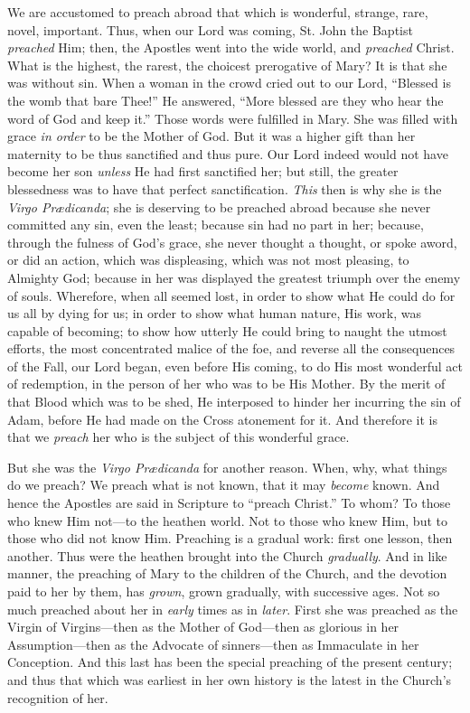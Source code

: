 We are accustomed to preach
abroad that which is wonderful, strange, rare, novel, important. Thus,
when our Lord was coming, St. John the Baptist \emph{preached} Him;
then, the Apostles went into the wide world, and \emph{preached} Christ.
What is the highest, the rarest, the choicest prerogative of Mary? It is
that she was without sin. When a woman in the crowd cried out to our
Lord, ``Blessed is the womb that bare Thee!'' He answered, ``More blessed
are they who hear the word of God and keep it.'' Those words were
fulfilled in Mary. She was filled with grace \emph{in order} to be the
Mother of God. But it was a higher gift than her maternity to be thus
sanctified and thus pure. Our Lord indeed would not have become her
son \emph{unless} He had first sanctified her; but still, the greater
blessedness was to have that perfect sanctification. \emph{This} then is
why she is the \emph{Virgo Prædicanda}; she is deserving to be preached
abroad because she never committed any sin, even the least; because sin
had no part in her; because, through the fulness of God's grace, she
never thought a thought, or spoke a\emph{}word, or did an action, which
was displeasing, which was not most pleasing, to Almighty God; because
in her was displayed the greatest triumph over the enemy of souls.
Wherefore, when all seemed lost, in order to show what He could do for
us all by dying for us; in order to show what human nature, His work,
was capable of becoming; to show how utterly He could bring to naught
the utmost efforts, the most concentrated malice of the foe, and reverse
all the consequences of the Fall, our Lord began, even before His
coming, to do His most wonderful act of redemption, in the person of her
who was to be His Mother. By the merit of that Blood which was to be
shed, He interposed to hinder her incurring the sin of Adam, before He
had made on the Cross atonement for it. And therefore it is that we \emph{preach}
her who is the subject of this wonderful grace.

But she was the \emph{Virgo Prædicanda}
for another reason. When, why, what things do we preach? We preach what
is not known, that it may \emph{become} known. And hence the Apostles
are said in Scripture to ``preach Christ.'' To whom? To those who knew Him
not—to the heathen world. Not to those who knew Him, but to those who
did not know Him. Preaching is a gradual work: first one lesson, then
another. Thus were the heathen brought into the Church \emph{gradually}.
And in like manner, the preaching of Mary to the children of the Church,
and the devotion paid to her by them, has \emph{grown}, grown gradually,
with successive ages. Not so much preached about her in \emph{early}
times as in \emph{later}. First she was preached as the Virgin of
Virgins—then as the Mother of God—then as glorious in her
Assumption—then as the Advocate of sinners—then as Immaculate in her
Conception. And this last has been the special preaching of the present
century; and thus that which was earliest in her own history is the
latest in the Church's recognition of her.

